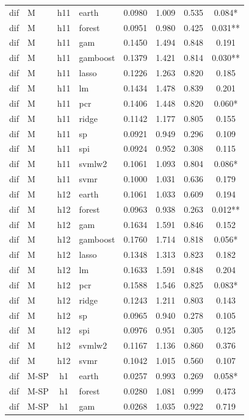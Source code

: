 \begin{ThreePartTable}
\begin{longtable}[t]{llclcccc}
\addlinespace
dif & M & h11 & earth & 0.0980 & 1.009 & 0.535 & 0.084*\\
dif & M & h11 & forest & 0.0951 & 0.980 & 0.425 & 0.031**\\
dif & M & h11 & gam & 0.1450 & 1.494 & 0.848 & 0.191\\
dif & M & h11 & gamboost & 0.1379 & 1.421 & 0.814 & 0.030**\\
dif & M & h11 & lasso & 0.1226 & 1.263 & 0.820 & 0.185\\
dif & M & h11 & lm & 0.1434 & 1.478 & 0.839 & 0.201\\
dif & M & h11 & pcr & 0.1406 & 1.448 & 0.820 & 0.060*\\
dif & M & h11 & ridge & 0.1142 & 1.177 & 0.805 & 0.155\\
dif & M & h11 & sp & 0.0921 & 0.949 & 0.296 & 0.109\\
dif & M & h11 & spi & 0.0924 & 0.952 & 0.308 & 0.115\\
dif & M & h11 & svmlw2 & 0.1061 & 1.093 & 0.804 & 0.086*\\
dif & M & h11 & svmr & 0.1000 & 1.031 & 0.636 & 0.179\\
\addlinespace
dif & M & h12 & earth & 0.1061 & 1.033 & 0.609 & 0.194\\
dif & M & h12 & forest & 0.0963 & 0.938 & 0.263 & 0.012**\\
dif & M & h12 & gam & 0.1634 & 1.591 & 0.846 & 0.152\\
dif & M & h12 & gamboost & 0.1760 & 1.714 & 0.818 & 0.056*\\
dif & M & h12 & lasso & 0.1348 & 1.313 & 0.823 & 0.182\\
dif & M & h12 & lm & 0.1633 & 1.591 & 0.848 & 0.204\\
dif & M & h12 & pcr & 0.1588 & 1.546 & 0.825 & 0.083*\\
dif & M & h12 & ridge & 0.1243 & 1.211 & 0.803 & 0.143\\
dif & M & h12 & sp & 0.0965 & 0.940 & 0.278 & 0.105\\
dif & M & h12 & spi & 0.0976 & 0.951 & 0.305 & 0.125\\
dif & M & h12 & svmlw2 & 0.1167 & 1.136 & 0.860 & 0.376\\
dif & M & h12 & svmr & 0.1042 & 1.015 & 0.560 & 0.107\\
\addlinespace
dif & M-SP & h1 & earth & 0.0257 & 0.993 & 0.269 & 0.058*\\
dif & M-SP & h1 & forest & 0.0280 & 1.081 & 0.999 & 0.473\\
dif & M-SP & h1 & gam & 0.0268 & 1.035 & 0.922 & 0.719\\

\end{longtable}
\end{ThreePartTable}
